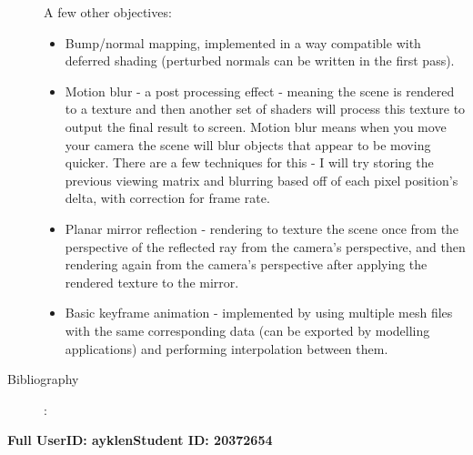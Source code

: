 \documentclass {article}
\begin{document}
\begin{description}
    A few other objectives:
    \begin{itemize}
      \item
        Bump/normal mapping, implemented in a way compatible with deferred shading (perturbed normals can be written in the first pass).

      \item
        Motion blur - a post processing effect - meaning the scene is rendered to a texture and then another set of shaders will process this texture to output the final result to screen. Motion blur means when you move your camera the scene will blur objects that appear to be moving quicker. There are a few techniques for this - I will try storing the previous viewing matrix and blurring based off of each pixel position's delta, with correction for frame rate.

      \item
        Planar mirror reflection - rendering to texture the scene once from the perspective of the reflected ray from the camera's perspective, and then rendering again from the camera's perspective after applying the rendered texture to the mirror.

      \item
        Basic keyframe animation - implemented by using multiple mesh files with the same corresponding data (can be exported by modelling applications) and performing interpolation between them.

    \end{itemize}

  \item[Bibliography]:\\

    \begingroup
    \renewcommand{\section}[2]{}%
    \nocite{*}
    {}
    
    \endgroup

\end{description}
\newpage



{\hfill{\bf Full UserID: ayklen}\hfill{\bf Student ID: 20372654}\hfill}
\end{document}
